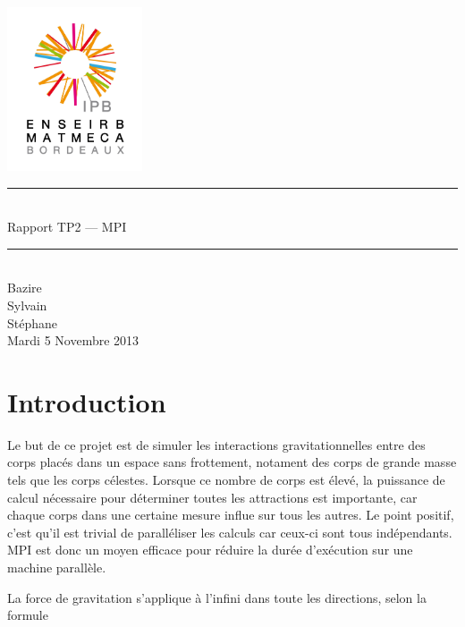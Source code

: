 \documentclass[a4paper,11pt]{article}
\begin{document}
\begin{titlepage}
  \begin{center}

    \begin{center}
      \includegraphics[width=4cm]{EM.jpg}
    \end{center}

    \vspace*{1cm}
        
    \rule{0.75\linewidth}{0.7mm}\\[0.4cm]
    {\Huge Rapport TP2 --- MPI\\[0.4cm]}
    \rule{0.75\linewidth}{0.7mm} \\[1.5cm]

    {\Large Bazire \\Sylvain {}\\Stéphane \\[2cm]}
    {\Large Mardi 5 Novembre 2013}
  \end{center}
\end{titlepage}

\tableofcontents
\clearpage
\section{Introduction}

Le but de ce projet est de simuler les interactions gravitationnelles entre des corps placés dans un espace sans frottement, notament des corps de grande masse tels que les corps célestes. Lorsque ce nombre de corps est élevé, la puissance de calcul nécessaire pour déterminer toutes les attractions est importante, car chaque corps dans une certaine mesure influe sur tous les autres. Le point positif, c'est qu'il est trivial de paralléliser les calculs car ceux-ci sont tous indépendants. MPI est donc un moyen efficace pour réduire la durée d'exécution sur une machine parallèle.

La force de gravitation s'applique à l'infini dans toute les directions, selon la formule
\end{document}

